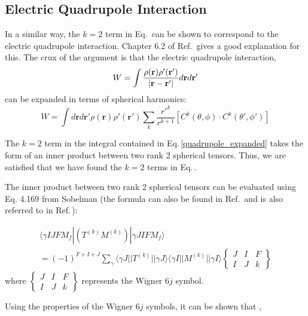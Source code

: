 \subsection{Electric Quadrupole Interaction}
In a similar way, the $k=2$ term in Eq.\,\label{TkMk_hyperfine} can be shown to correspond to the electric quadrupole interaction. Chapter 6.2 of Ref.\,\cite{sobelman_spectra} gives a good explanation for this. The crux of the argument is that the electric quadrupole interaction,
\begin{equation}
W=\int\frac{\rho(\mathbf{r})\rho'(\mathbf{r}')}{|\mathbf{r}-\mathbf{r}'|}d\mathbf{r}d\mathbf{r'}\\
\end{equation}
can  be expanded in terms of spherical harmonics: 
\begin{equation}
W=\int d\mathbf{r}d\mathbf{r'}
\rho(\mathbf{r})\rho'(\mathbf{r}')\sum_k \frac{r'^k}{r^{k+1}}[C^k(\theta,\phi)\cdot C^k(\theta',\phi')] \label{quadrupole_expanded}
\end{equation}

The $k=2$ term in the integral contained in Eq.\,\ref{quadrupole_expanded} takes the form of an inner product between two rank 2 spherical tensors. Thus, we are satisfied that we have found the $k=2$ terms in Eq.\,\cite{TkMk_hyperfine}.

The inner product between two rank 2 spherical tensors can be evaluated using Eq. 4.169 from Sobelman \cite{sobelman_spectra} (the formula can also be found in Ref.\,\cite{Racah2} and is also referred to in Ref.\,\cite{schwartz_hyperfine_expansion}):

\begin{multline}\label{4169_combine_diff_tensors}
\langle\gamma I J F M_f|(T^{(k)}M^{(k)})|\gamma J I F M_f\rangle \\
=
(-1)^{F+I+J} \sum_{\gamma} \langle\gamma J||T^{(k)}||\gamma J\rangle
\langle\gamma I || M^{(k)} ||\gamma I\rangle
\begin{Bmatrix}
J & I & F \\
I & J & k
\end{Bmatrix}
\end{multline}
where 
$\begin{Bmatrix}
J & I & F \\
I & J & k
\end{Bmatrix}$ represents the Wigner $6j$ symbol. 

Using the properties of the Wigner $6j$ symbols, it can be shown that \cite{cuaMITnotes}\cite{sobelman_spectra}, 

